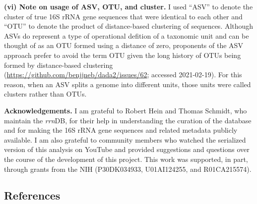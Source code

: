 \documentclass[
]{article}
\begin{document}
\textbf{(vi) Note on usage of ASV, OTU, and cluster.} I used ``ASV'' to
denote the cluster of true 16S rRNA gene sequences that were identical
to each other and ``OTU'' to denote the product of distance-based
clustering of sequences. Although ASVs do represent a type of
operational defition of a taxonomic unit and can be thought of as an OTU
formed using a distance of zero, proponents of the ASV approach prefer
to avoid the term OTU given the long history of OTUs being formed by
distance-based clustering
(\url{https://github.com/benjjneb/dada2/issues/62}; accessed
2021-02-19). For this reason, when an ASV splits a genome into different
units, those units were called clusters rather than OTUs.

\vspace{20mm}

\textbf{Acknowledgements.} I am grateful to Robert Hein and Thomas
Schmidt, who maintain the \emph{rrn}DB, for their help in understanding
the curation of the database and for making the 16S rRNA gene sequences
and related metadata publicly available. I am also grateful to community
members who watched the serialized version of this analysis on YouTube
and provided suggestions and questions over the course of the
development of this project. This work was supported, in part, through
grants from the NIH (P30DK034933, U01AI124255, and R01CA215574).

\newpage

\hypertarget{references}{%
\subsection{References}\label{references}}

\setlength{\parindent}{-0.25in}
\setlength{\leftskip}{0.25in}

\noindent
\end{document}
